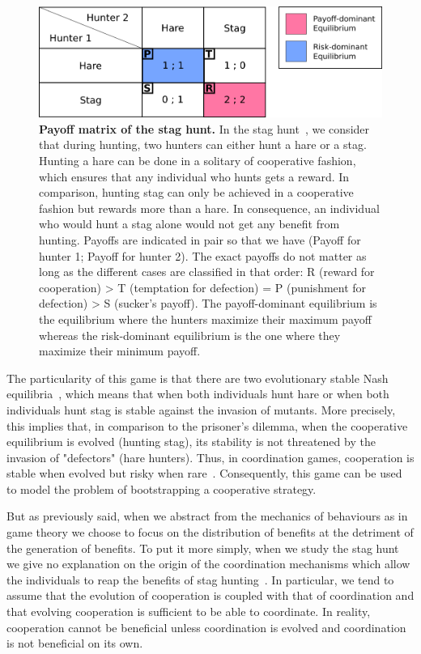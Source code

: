     \begin{figure}[hbtp]
        \begin{center}
          \includegraphics[scale = 0.30]{fig/Intro/StagHunt.png}
          \caption{\textbf{Payoff matrix of the stag hunt.} 
          In the stag hunt~\parencite{Skyrms2004}, we consider that during hunting, two hunters can either hunt a hare or a stag. Hunting a hare can be done in a solitary of cooperative fashion, which ensures that any individual who hunts gets a reward. In comparison, hunting stag can only be achieved in a cooperative fashion but rewards more than a hare. In consequence, an individual who would hunt a stag alone would not get any benefit from hunting. Payoffs are indicated in pair so that we have (Payoff for hunter 1; Payoff for hunter 2). The exact payoffs do not matter as long as the different cases are classified in that order: R (reward for cooperation) > T (temptation for defection) = P (punishment for defection) > S (sucker's payoff). The payoff-dominant equilibrium is the equilibrium where the hunters maximize their maximum payoff whereas the risk-dominant equilibrium is the one where they maximize their minimum payoff.} 
          \label{fig:MatrixStagHunt}
        \end{center}
    \end{figure}

    The particularity of this game is that there are two evolutionary stable Nash equilibria~\parencite{Nash1950, MaynardSmith1973}, which means that when both individuals hunt hare or when both individuals hunt stag is stable against the invasion of mutants. More precisely, this implies that, in comparison to the prisoner's dilemma, when the cooperative equilibrium is evolved (hunting stag), its stability is not threatened by the invasion of "defectors" (hare hunters). Thus, in coordination games, cooperation is stable when evolved but risky when rare~\parencite{Forber2015}. Consequently, this game can be used to model the problem of bootstrapping a cooperative strategy.

    But as previously said, when we abstract from the mechanics of behaviours as in game theory we choose to focus on the distribution of benefits at the detriment of the generation of benefits. To put it more simply, when we study the stag hunt we give no explanation on the origin of the coordination mechanisms which allow the individuals to reap the benefits of stag hunting~\parencite{Calcott2007a}. In particular, we tend to assume that the evolution of cooperation is coupled with that of coordination and that evolving cooperation is sufficient to be able to coordinate. In reality, cooperation cannot be beneficial unless coordination is evolved and coordination is not beneficial on its own.

